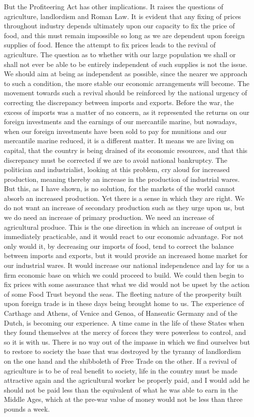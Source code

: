 \documentclass{book}
\begin{document}
But the Profiteering Act has other implications. It raises the questions of agriculture, landlordism and Roman Law. It is evident that any fixing of prices throughout industry depends ultimately upon our capacity to fix the price of food, and this must remain impossible so long as we are dependent upon foreign supplies of food. Hence the attempt to fix prices leads to the revival of agriculture. The question as to whether with our large population we shall or shall not ever be able to be entirely independent of such supplies is not the issue. We should aim at being as independent as possible, since the nearer we approach to such a condition, the more stable our economic arrangements will become. The movement towards such a revival should be reinforced by the national urgency of correcting the discrepancy between imports and exports. Before the war, the excess of imports was a matter of no concern, as it represented the returns on our foreign investments and the earnings of our mercantile marine, but nowadays, when our foreign investments have been sold to pay for munitions and our mercantile marine reduced, it is a different matter. It means we are living on capital, that the country is being drained of its economic resources, and that this discrepancy must be corrected if we are to avoid national bankruptcy. The politician and industrialist, looking at this problem, cry aloud for increased production, meaning thereby an increase in the production of industrial wares. But this, as I have shown, is no solution, for the markets of the world cannot absorb an increased production. Yet there is a sense in which they are right. We do not want an increase of secondary production such as they urge upon us, but we do need an increase of primary production. We need an increase of agricultural produce. This is the one direction in which an increase of output is immediately practicable, and it would react to our economic advantage. For not only would it, by decreasing our imports of food, tend to correct the balance between imports and exports, but it would provide an increased home market for our industrial wares. It would increase our national independence and lay for us a firm economic base on which we could proceed to build. We could then begin to fix prices with some assurance that what we did would not be upset by the action of some Food Trust beyond the seas. The fleeting nature of the prosperity built upon foreign trade is in these days being brought home to us. The experience of Carthage and Athens, of Venice and Genoa, of Hanseatic Germany and of the Dutch, is becoming our experience. A time came in the life of these States when they found themselves at the mercy of forces they were powerless to control, and so it is with us. There is no way out of the impasse in which we find ourselves but to restore to society the base that was destroyed by the tyranny of landlordism on the one hand and the shibboleth of Free Trade on the other. If a revival of agriculture is to be of real benefit to society, life in the country must be made attractive again and the agricultural worker be properly paid, and I would add he should not be paid less than the equivalent of what he was able to earn in the Middle Ages, which at the pre-war value of money would not be less than three pounds a week. 
\end{document}
